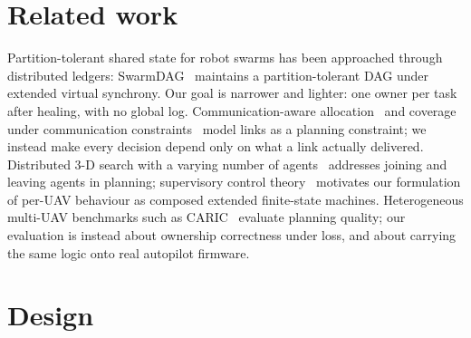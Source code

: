 \documentclass[a4paper,11pt]{article}
\begin{document}
\section{Related work}

Partition-tolerant shared state for robot swarms has been approached through
distributed ledgers: SwarmDAG~\cite{tran2019swarmdag} maintains a
partition-tolerant DAG under extended virtual synchrony. Our goal is narrower
and lighter: one owner per task after healing, with no global log.
Communication-aware allocation~\cite{lu2026commaware} and coverage under
communication constraints~\cite{loizou2016coverage} model links as a planning
constraint; we instead make every decision depend only on what a link actually
delivered. Distributed 3-D search with a varying number of
agents~\cite{papaioannou2023glimpse} addresses joining and leaving agents in
planning; supervisory control theory~\cite{lopes2016supervisory} motivates our
formulation of per-UAV behaviour as composed extended finite-state machines.
Heterogeneous multi-UAV benchmarks such as CARIC~\cite{cao2025caric}
evaluate planning quality; our evaluation is instead about ownership
correctness under loss, and about carrying the same logic onto real autopilot
firmware.

\section{Design}\label{sec:design}
\end{document}
